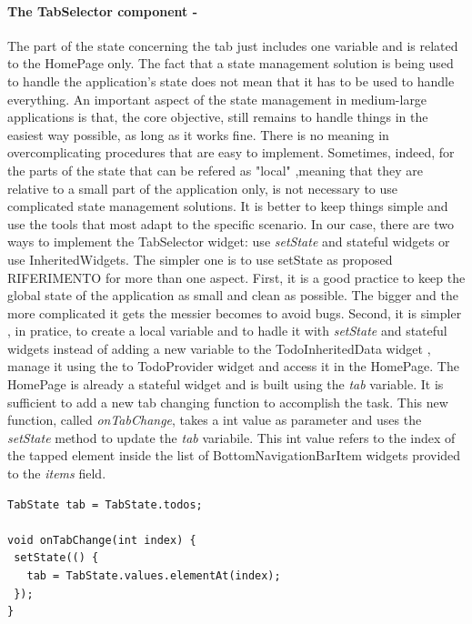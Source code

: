 \paragraph{The TabSelector component - }
\label{subpar:todo_app_inherited_widget_tabselector_component}
The part of the state concerning the tab just includes  one variable and is related to the HomePage only. The fact that a state management solution is being used to handle the application's state does not mean that it has to be used to handle everything. An important aspect of the state management in medium-large applications is that, the core objective, still remains to handle things in the easiest way possible, as long as it works fine. There is no meaning in overcomplicating procedures that are easy to implement. Sometimes, indeed, for the parts of the state that can be refered as "local" ,meaning that they are relative to a small part of the application only, is not necessary to use complicated state management solutions. It is better to keep things simple and use the tools that most adapt to the specific scenario.
In our case, there are two ways to implement the TabSelector widget: use \textit{setState} and stateful widgets or use InheritedWidgets. The simpler one is to use setState as proposed RIFERIMENTO for more than one aspect. First, it is a good practice to keep the global state of the application as small and clean as possible. The bigger and the more complicated it gets the messier becomes to avoid bugs. Second, it is simpler , in pratice, to create a local variable and to hadle it with \textit{setState} and stateful widgets instead of adding a new variable to the TodoInheritedData widget , manage it using the to TodoProvider widget and  access it in the HomePage. The HomePage is already a stateful widget and is built using the \textit{tab }variable. It is sufficient to add a new tab changing function to accomplish the task. This new function, called \textit{onTabChange}, takes a int value as parameter and uses the \textit{setState} method to update the \textit{tab} variabile. This int value refers to the index of the tapped element inside the list of BottomNavigationBarItem widgets provided to the \textit{items} field.
\mbox{}\\
\begin{code}
\mbox{}
\label{code:2.30}
\begin{verbatim}
TabState tab = TabState.todos;

void onTabChange(int index) {
 setState(() {
   tab = TabState.values.elementAt(index);
 });
}
\end{verbatim}
\end{code}
